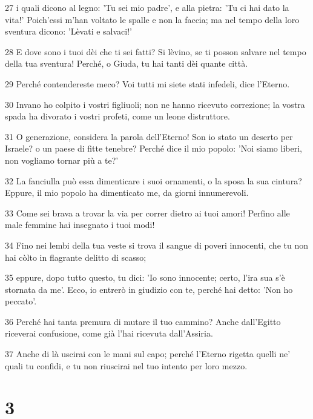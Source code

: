 \par 27 i quali dicono al legno: 'Tu sei mio padre', e alla pietra: 'Tu ci hai dato la vita!' Poich'essi m'han voltato le spalle e non la faccia; ma nel tempo della loro sventura dicono: 'Lèvati e salvaci!'
\par 28 E dove sono i tuoi dèi che ti sei fatti? Si lèvino, se ti posson salvare nel tempo della tua sventura! Perché, o Giuda, tu hai tanti dèi quante città.
\par 29 Perché contendereste meco? Voi tutti mi siete stati infedeli, dice l'Eterno.
\par 30 Invano ho colpito i vostri figliuoli; non ne hanno ricevuto correzione; la vostra spada ha divorato i vostri profeti, come un leone distruttore.
\par 31 O generazione, considera la parola dell'Eterno! Son io stato un deserto per Israele? o un paese di fitte tenebre? Perché dice il mio popolo: 'Noi siamo liberi, non vogliamo tornar più a te?'
\par 32 La fanciulla può essa dimenticare i suoi ornamenti, o la sposa la sua cintura? Eppure, il mio popolo ha dimenticato me, da giorni innumerevoli.
\par 33 Come sei brava a trovar la via per correr dietro ai tuoi amori! Perfino alle male femmine hai insegnato i tuoi modi!
\par 34 Fino nei lembi della tua veste si trova il sangue di poveri innocenti, che tu non hai còlto in flagrante delitto di scasso;
\par 35 eppure, dopo tutto questo, tu dici: 'Io sono innocente; certo, l'ira sua s'è stornata da me'. Ecco, io entrerò in giudizio con te, perché hai detto: 'Non ho peccato'.
\par 36 Perché hai tanta premura di mutare il tuo cammino? Anche dall'Egitto riceverai confusione, come già l'hai ricevuta dall'Assiria.
\par 37 Anche di là uscirai con le mani sul capo; perché l'Eterno rigetta quelli ne' quali tu confidi, e tu non riuscirai nel tuo intento per loro mezzo.

\chapter{3}

